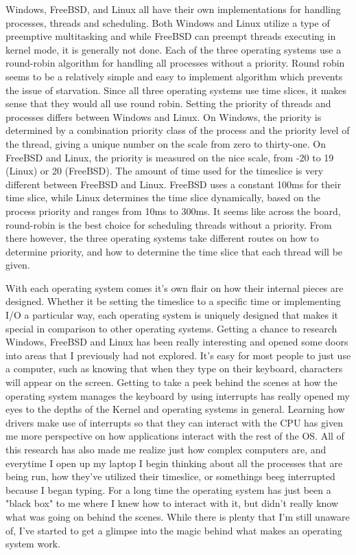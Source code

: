 \documentclass[letterpaper,10pt,draftclsnofoot,onecolumn,titlepage]{IEEEtran}
\begin{document}
	Windows, FreeBSD, and Linux all have their own implementations for handling processes, threads and scheduling.
	Both Windows and Linux utilize a type of preemptive multitasking and while FreeBSD can preempt threads executing in kernel mode, it is generally not done.
	Each of the three operating systems use a round-robin algorithm for handling all processes without a priority.
	Round robin seems to be a relatively simple and easy to implement algorithm which prevents the issue of starvation.
	Since all three operating systems use time slices, it makes sense that they would all use round robin.
	Setting the priority of threads and processes differs between Windows and Linux.
	On Windows, the priority is determined by a combination priority class of the process and the priority level of the thread, giving a unique number on the scale from zero to thirty-one.
	On FreeBSD and Linux, the priority is measured on the nice scale, from -20 to 19 (Linux) or 20 (FreeBSD).
	The amount of time used for the timeslice is very different between FreeBSD and Linux. FreeBSD uses a constant 100ms for their time slice, while Linux determines the time slice dynamically, based on the process priority and ranges from 10ms to 300ms.
	It seems like across the board, round-robin is the best choice for scheduling threads without a priority.
	From there however, the three operating systems take different routes on how to determine priority, and how to determine the time slice that each thread will be given.

	With each operating system comes it's own flair on how their internal pieces are designed.
	Whether it be setting the timeslice to a specific time or implementing I/O a particular way, each operating system is uniquely designed that makes it special in comparison to other operating systems.
	Getting a chance to research Windows, FreeBSD and Linux has been really interesting and opened some doors into areas that I previously had not explored.
	It's easy for most people to just use a computer, such as knowing that when they type on their keyboard, characters will appear on the screen.
	Getting to take a peek behind the scenes at how the operating system manages the keyboard by using interrupts has really opened my eyes to the depths of the Kernel and operating systems in general.
	Learning how drivers make use of interrupts so that they can interact with the CPU has given me more perspective on how applications interact with the rest of the OS.
	All of this research has also made me realize just how complex computers are, and everytime I open up my laptop I begin thinking about all the processes that are being run, how they've utilized their timeslice, or somethings beeg interrupted because I began typing.
	For a long time the operating system has just been a "black box" to me where I knew how to interact with it, but didn't really know what was going on behind the scenes.
	While there is plenty that I'm still unaware of, I've started to get a glimpse into the magic behind what makes an operating system work.
	
\end{document}
